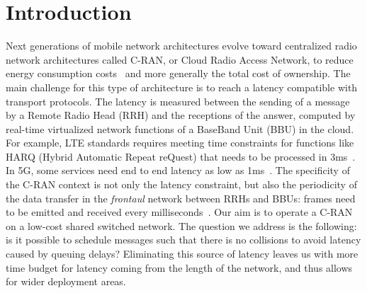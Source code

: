 \documentclass[10pt, conference, letterpaper]{IEEEtran}
\begin{document}
\section{Introduction}

Next generations of mobile network architectures evolve toward centralized radio network architectures called C-RAN, or Cloud Radio Access Network, to reduce energy consumption costs~\cite{mobile2011c} and more generally the total cost of ownership. The main challenge for this type of architecture is to reach a latency compatible with transport protocols. The latency is measured between the sending of a message by a Remote Radio Head (RRH) and the receptions of the answer, computed by real-time virtualized network functions of a BaseBand Unit (BBU) in the cloud. For example, LTE standards requires meeting time constraints for functions like HARQ (Hybrid Automatic Repeat reQuest) that needs to be processed in $3$ms~\cite{bouguen2012lte}. In 5G, some services need end to end latency as low as 1ms~\cite{3gpp5g}. The specificity of the C-RAN context is not only the latency constraint, but also the periodicity of the data transfer in the \emph{frontaul} network between RRHs and BBUs: frames need to be emitted and received every milliseconds~\cite{bouguen2012lte}.
Our aim is to operate a C-RAN on a low-cost shared switched network.
The question we address is the following: is it possible to schedule messages such that there is no collisions to avoid latency caused by queuing delays? 
Eliminating this source of latency leaves us with more time budget for latency coming from the length of the network, and thus allows for wider deployment areas.
\end{document}
